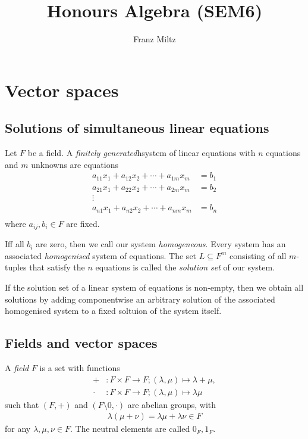 \documentclass{article}
\begin{document}
\mkthmstwounified
\title{Honours Algebra (SEM6)}
\author{Franz Miltz}
\maketitle
\tableofcontents
\pagebreak

\section{Vector spaces}

\subsection{Solutions of simultaneous linear equations}

\begin{definition}
	Let $F$ be a field. A \emph{finitely generated}h{system of linear equations} with $n$ equations and
	$m$ unknowns are equations
	\begin{align*}
		a_{11}x_1 + a_{12}x_2 + \cdots + a_{1m}x_m & = b_1 \\
		a_{21}x_1 + a_{22}x_2 + \cdots + a_{2m}x_m & = b_2 \\
		\vdots                                             \\
		a_{n1}x_1 + a_{n2}x_2 + \cdots + a_{nm}x_m & = b_n \\
	\end{align*}
	where $a_{ij},b_i\in F$ are fixed.

	Iff all $b_i$ are zero, then we call our system \emph{homogeneous}. Every system
	has an associated \emph{homogenised} system of equations.
	The set $L\subseteq F^m$ consisting of all $m$-tuples that satisfy the
	$n$ equations is called the \emph{solution set} of our system.
\end{definition}

\begin{theorem}[Notes 1.1.4]
	If the solution set of a linear system of equations is non-empty, then we obtain
	all solutions by adding componentwise an arbitrary solution of the associated
	homogenised system to a fixed soltuion of the system itself.
\end{theorem}

\subsection{Fields and vector spaces}

\begin{definition}
	A \emph{field} $F$ is a set with functions
	\begin{align*}
		+     & : F\times F \to F ; (\lambda,\mu) \mapsto \lambda + \mu, \\
		\cdot & : F\times F \to F ; (\lambda,\mu) \mapsto \lambda \mu
	\end{align*}
	such that $(F,+)$ and $(F\setminus{0},\cdot)$ are abelian groups, with
	\begin{align*}
		\lambda(\mu + \nu) = \lambda \mu + \lambda \nu \in F
	\end{align*}
	for any $\lambda,\mu,\nu\in F$. The neutral elements are called $0_F,1_F$.
\end{definition}
\end{document}
